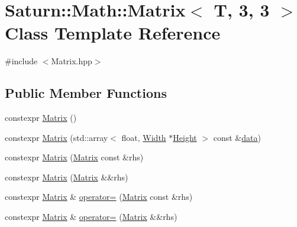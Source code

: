 \hypertarget{class_saturn_1_1_math_1_1_matrix_3_01_t_00_013_00_013_01_4}{}\section{Saturn\+:\+:Math\+:\+:Matrix$<$ T, 3, 3 $>$ Class Template Reference}
\label{class_saturn_1_1_math_1_1_matrix_3_01_t_00_013_00_013_01_4}


{\ttfamily \#include $<$Matrix.\+hpp$>$}

\subsection*{Public Member Functions}
\begin{DoxyCompactItemize}
\item 
constexpr \mbox{\hyperlink{class_saturn_1_1_math_1_1_matrix_3_01_t_00_013_00_013_01_4_a0ab2d3c41caf7d097a78aff95b811f7b}{Matrix}} ()
\item 
constexpr \mbox{\hyperlink{class_saturn_1_1_math_1_1_matrix_3_01_t_00_013_00_013_01_4_ab71b1f5b9ed7f43c82cc07c205bce57c}{Matrix}} (std\+::array$<$ float, \mbox{\hyperlink{class_saturn_1_1_math_1_1_matrix_3_01_t_00_013_00_013_01_4_a7df732e9641685e8dbbff6f06c6eedab}{Width}} $\ast$\mbox{\hyperlink{class_saturn_1_1_math_1_1_matrix_3_01_t_00_013_00_013_01_4_a6aaca5d7ab1d60b436c7f8076d2c8b06}{Height}} $>$ const \&\mbox{\hyperlink{glad_8h_a1848da31b3e095a7152c7cba8375936d}{data}})
\item 
constexpr \mbox{\hyperlink{class_saturn_1_1_math_1_1_matrix_3_01_t_00_013_00_013_01_4_aa2dcca39a1ef77fc5c0b00f7cb87db92}{Matrix}} (\mbox{\hyperlink{class_saturn_1_1_math_1_1_matrix}{Matrix}} const \&rhs)
\item 
constexpr \mbox{\hyperlink{class_saturn_1_1_math_1_1_matrix_3_01_t_00_013_00_013_01_4_a6380e74478014212ef8c0cb9a3933b45}{Matrix}} (\mbox{\hyperlink{class_saturn_1_1_math_1_1_matrix}{Matrix}} \&\&rhs)
\item 
constexpr \mbox{\hyperlink{class_saturn_1_1_math_1_1_matrix}{Matrix}} \& \mbox{\hyperlink{class_saturn_1_1_math_1_1_matrix_3_01_t_00_013_00_013_01_4_adaf26db4cf954ac49578c32c2d1cab06}{operator=}} (\mbox{\hyperlink{class_saturn_1_1_math_1_1_matrix}{Matrix}} const \&rhs)
\item 
constexpr \mbox{\hyperlink{class_saturn_1_1_math_1_1_matrix}{Matrix}} \& \mbox{\hyperlink{class_saturn_1_1_math_1_1_matrix_3_01_t_00_013_00_013_01_4_a53826aa8c2fa06279e9a9771687abc48}{operator=}} (\mbox{\hyperlink{class_saturn_1_1_math_1_1_matrix}{Matrix}} \&\&rhs)

\end{DoxyCompactItemize}
